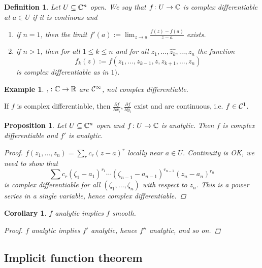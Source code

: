 \documentclass[A4paper, british]{amsart}
\theoremstyle{darkgreentheorem}
\newtheorem{prop}[thm]{Proposition}
\newtheorem{cor}[thm]{Corollary}
\theoremstyle{darkbluedefinition}
\newtheorem{defn}[thm]{Definition}
\theoremstyle{darkredexample}
\newtheorem{exa}[thm]{Example}
\theoremstyle{remark}
\let\Re\relax
\DeclareMathOperator{\Re}{Re}
\let\Im\relax
\DeclareMathOperator{\Im}{Im}
\newcommand{\1}{\mathbbm{1}}
\begin{document}
\begin{defn}
    Let $U\subseteq \mathbb{C}^{n}$ open.
    We say that $f\colon U\to \mathbb{C}$ is \textit{complex differentiable} at $a\in U$ if it is continous and
    \begin{enumerate}[label=\roman*)]
	\item if $n=1$, then the limit $f'(a):=\lim_{z\to a}\frac{f(z)-f(a)}{z-a}$ exists.
	\item if $n>1$, then for all $1\leqslant k\leqslant n$ and for all $z_{1},\ldots,\hat{z_{k}},\ldots,z_{n}$ the function
	    \[ f_{k}(z):=f(z_{1},\ldots,z_{k-1},z,z_{k+1},\ldots,z_{n})\]
	    is complex differentiable as in $1)$.
    \end{enumerate}
\end{defn}

\begin{exa}
    $\Re,\Im\colon \C\to \R$ are $\mathcal{C}^{\infty}$, not complex differentiable.
\end{exa}

If $f$ is complex differentiable, then $\frac{\partial f}{\partial x_{i}},\frac{\partial f}{\partial y_{i}}$ exist and are continuous, i.e. $f\in \mathcal{C}^{1}$.

\begin{prop}
    Let $U\subseteq \mathbb{C}^{n}$ open and $f\colon U\to \mathbb{C}$ is analytic.
    Then $f$ is complex differentiable and $f'$ is analytic.
    \begin{proof}
	$f(z_{1},\ldots,z_{n})=\sum_{r}c_{r}(z-a)^{r}$ locally near $a\in U$.
	Continuity is OK, we need to show that
	\[ \sum c_{r}(\zeta_{1}-a_{1})^{r_{1}}\cdots (\zeta_{n-1}-a_{n-1})^{r_{n-1}}(z_{n}-a_{n})^{r_{n}}\]
	is complex differentiable for all $(\zeta_{1},\ldots,\zeta_{n})$ with respect to $z_{n}$.
	This is a power series in a single variable, hence complex differentiable.
    \end{proof}
\end{prop}

\begin{cor}
    $f$ analytic implies $f$ smooth.
    \begin{proof}
	$f$ analytic implies $f'$ analytic, hence $f''$ analytic, and so on.
    \end{proof}
\end{cor}

\subsection{Implicit function theorem}
\end{document}
